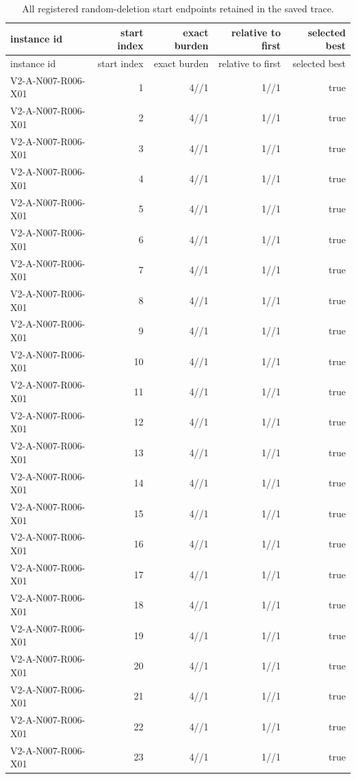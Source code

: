 {\footnotesize
\begin{longtable}{lrrrr}
\caption{All registered random-deletion start endpoints retained in the saved trace.}\label{tab:aor-multistart-starts}\\
\toprule
instance id & start index & exact burden & relative to first & selected best \\
\midrule
\endfirsthead
\toprule
instance id & start index & exact burden & relative to first & selected best \\
\midrule
\endhead
V2-A-N007-R006-X01 & 1 & 4//1 & 1//1 & true \\
V2-A-N007-R006-X01 & 2 & 4//1 & 1//1 & true \\
V2-A-N007-R006-X01 & 3 & 4//1 & 1//1 & true \\
V2-A-N007-R006-X01 & 4 & 4//1 & 1//1 & true \\
V2-A-N007-R006-X01 & 5 & 4//1 & 1//1 & true \\
V2-A-N007-R006-X01 & 6 & 4//1 & 1//1 & true \\
V2-A-N007-R006-X01 & 7 & 4//1 & 1//1 & true \\
V2-A-N007-R006-X01 & 8 & 4//1 & 1//1 & true \\
V2-A-N007-R006-X01 & 9 & 4//1 & 1//1 & true \\
V2-A-N007-R006-X01 & 10 & 4//1 & 1//1 & true \\
V2-A-N007-R006-X01 & 11 & 4//1 & 1//1 & true \\
V2-A-N007-R006-X01 & 12 & 4//1 & 1//1 & true \\
V2-A-N007-R006-X01 & 13 & 4//1 & 1//1 & true \\
V2-A-N007-R006-X01 & 14 & 4//1 & 1//1 & true \\
V2-A-N007-R006-X01 & 15 & 4//1 & 1//1 & true \\
V2-A-N007-R006-X01 & 16 & 4//1 & 1//1 & true \\
V2-A-N007-R006-X01 & 17 & 4//1 & 1//1 & true \\
V2-A-N007-R006-X01 & 18 & 4//1 & 1//1 & true \\
V2-A-N007-R006-X01 & 19 & 4//1 & 1//1 & true \\
V2-A-N007-R006-X01 & 20 & 4//1 & 1//1 & true \\
V2-A-N007-R006-X01 & 21 & 4//1 & 1//1 & true \\
V2-A-N007-R006-X01 & 22 & 4//1 & 1//1 & true \\
V2-A-N007-R006-X01 & 23 & 4//1 & 1//1 & true \\

\end{longtable}}
